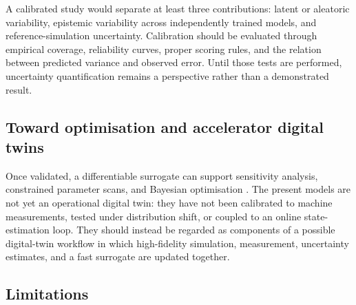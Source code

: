 A calibrated study would separate at least three contributions: latent or aleatoric variability, epistemic variability across independently trained models, and reference-simulation uncertainty. Calibration should be evaluated through empirical coverage, reliability curves, proper scoring rules, and the relation between predicted variance and observed error. Until those tests are performed, uncertainty quantification remains a perspective rather than a demonstrated result.

\subsection{Toward optimisation and accelerator digital twins}

Once validated, a differentiable surrogate can support sensitivity analysis, constrained parameter scans, and Bayesian optimisation \cite{roussel_bayesian_2024}. The present models are not yet an operational digital twin: they have not been calibrated to machine measurements, tested under distribution shift, or coupled to an online state-estimation loop. They should instead be regarded as components of a possible digital-twin workflow in which high-fidelity simulation, measurement, uncertainty estimates, and a fast surrogate are updated together.

\subsection{Limitations}


